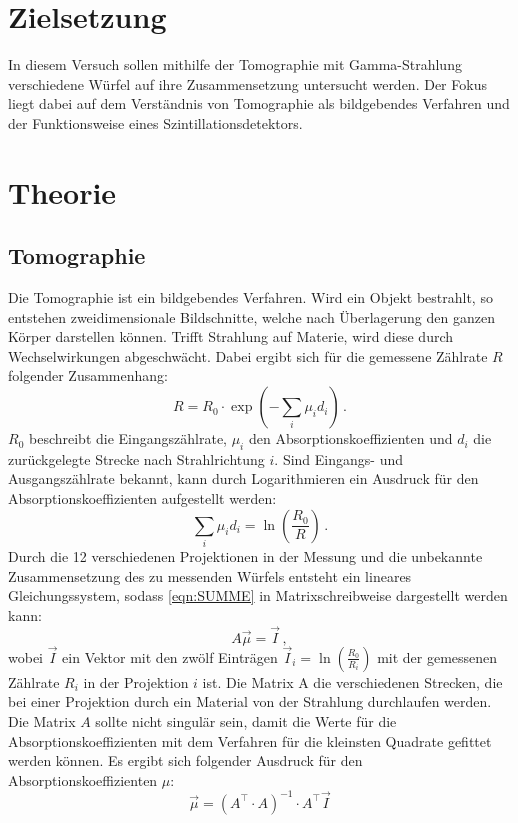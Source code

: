 \section{Zielsetzung}
In diesem Versuch sollen mithilfe der Tomographie mit Gamma-Strahlung verschiedene Würfel auf ihre Zusammensetzung untersucht werden.
Der Fokus liegt dabei auf dem Verständnis von Tomographie als bildgebendes Verfahren und der Funktionsweise eines Szintillationsdetektors.

\section{Theorie}
\label{sec:Theorie}

\subsection{Tomographie}
Die Tomographie ist ein bildgebendes Verfahren.
Wird ein Objekt bestrahlt, so entstehen zweidimensionale Bildschnitte, welche nach Überlagerung den ganzen Körper darstellen können.
Trifft Strahlung auf Materie, wird diese durch Wechselwirkungen abgeschwächt.
Dabei ergibt sich für die gemessene Zählrate $R$ folgender Zusammenhang:
\begin{equation*}
    R = R_0 \cdot \exp{(- \sum_{i} \mu_i d_i)} \, .
\end{equation*}
$R_0$ beschreibt die Eingangszählrate, $\mu_i$ den Absorptionskoeffizienten und $d_i$ die zurückgelegte Strecke nach Strahlrichtung $i$.
Sind Eingangs- und Ausgangszählrate bekannt, kann durch Logarithmieren ein Ausdruck für den Absorptionskoeffizienten aufgestellt werden:
\begin{equation}
    \sum_{i} \mu_i d_i = \ln\left(\frac{R_0}{R}\right) \, .
    \label{eqn:SUMME}
\end{equation}
Durch die 12 verschiedenen Projektionen in der Messung und die unbekannte Zusammensetzung des zu messenden Würfels 
entsteht ein lineares Gleichungssystem, sodass \eqref{eqn:SUMME} in Matrixschreibweise dargestellt werden kann:
\begin{equation}
    A \vec{\mu} = \vec{I} \, ,
    \label{eqn:matrix}
\end{equation}
wobei $\vec{I}$ ein Vektor mit den zwölf Einträgen $\vec{I}_i = \ln\left(\frac{R_0}{R_i}\right)$ mit der gemessenen Zählrate $R_i$ in der Projektion $i$ ist.
Die Matrix A die verschiedenen Strecken, die bei einer Projektion durch ein Material von der Strahlung durchlaufen werden.
Die Matrix $A$ sollte nicht singulär sein, damit die Werte für die Absorptionskoeffizienten mit dem Verfahren für die kleinsten Quadrate gefittet werden können.
Es ergibt sich folgender Ausdruck für den Absorptionskoeffizienten $\mu$:
\begin{equation*}
    \vec{\mu} = \left( A^\top \cdot A \right)^{-1} \cdot A^\top \vec{I}
\end{equation*}

